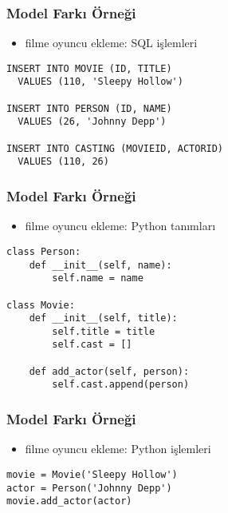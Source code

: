 \documentclass[dvipsnames]{beamer}
\theoremstyle{plain}
\begin{document}
\begin{frame}[fragile]
  \frametitle{Model Farkı Örneği}

  \begin{itemize}
    \item filme oyuncu ekleme: SQL işlemleri
  \end{itemize}

  \begin{lstlisting}[language=FullSQL]
INSERT INTO MOVIE (ID, TITLE)
  VALUES (110, 'Sleepy Hollow')

INSERT INTO PERSON (ID, NAME)
  VALUES (26, 'Johnny Depp')

INSERT INTO CASTING (MOVIEID, ACTORID)
  VALUES (110, 26)
  \end{lstlisting}
\end{frame}

\begin{frame}[fragile]
  \frametitle{Model Farkı Örneği}

  \begin{itemize}
    \item filme oyuncu ekleme: Python tanımları
  \end{itemize}

  \begin{lstlisting}
class Person:
    def __init__(self, name):
        self.name = name

class Movie:
    def __init__(self, title):
        self.title = title
        self.cast = []

    def add_actor(self, person):
        self.cast.append(person)
  \end{lstlisting}
\end{frame}

\begin{frame}[fragile]
  \frametitle{Model Farkı Örneği}

  \begin{itemize}
    \item filme oyuncu ekleme: Python işlemleri
  \end{itemize}

  \begin{lstlisting}
movie = Movie('Sleepy Hollow')
actor = Person('Johnny Depp')
movie.add_actor(actor)
  \end{lstlisting}
\end{frame}
\end{document}
